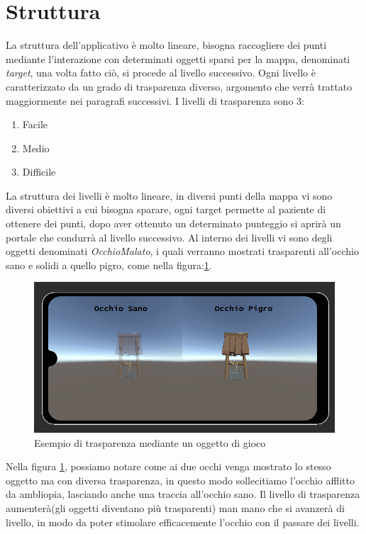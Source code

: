 \documentclass[
a4paper,
cleardoublepage=empty,
headings=twolinechapter,
numbers=autoenddot,
]{scrbook}
\begin{document}
	\section{Struttura}
	La struttura dell'applicativo è molto lineare, bisogna raccogliere dei punti mediante l'interazione con determinati oggetti sparsi per la mappa, denominati \textit{target}, una volta fatto ciò, si procede al livello successivo.
	Ogni livello è caratterizzato da un grado di trasparenza diverso, argomento che verrà trattato maggiormente nei paragrafi successivi.
	I livelli di trasparenza sono 3:
	\begin{enumerate}
		\item Facile
		\item Medio
		\item Difficile
	\end{enumerate}
	La struttura dei livelli è molto lineare, in diversi punti della mappa vi sono diversi obiettivi a cui bisogna sparare, ogni target permette al paziente di ottenere dei punti, dopo aver ottenuto un determinato punteggio si aprirà un portale che condurrà al livello successivo.
	Al interno dei livelli vi sono degli oggetti denominati \textit{OcchioMalato}, i quali verranno mostrati trasparenti all'occhio sano e solidi a quello pigro, come nella figura:\ref{fig:pozzo}. 
	\begin{figure}[H]
		\centering
		\includegraphics[width=0.8\linewidth]{image/Pr_trasparenza}
		\caption{Esempio di trasparenza mediante un oggetto di gioco}
		\label{fig:pozzo}
	\end{figure}
	Nella figura \ref{fig:pozzo}, possiamo notare come ai due occhi venga mostrato lo stesso oggetto ma con diversa trasparenza, in questo modo sollecitiamo l'occhio afflitto da ambliopia, lasciando anche una traccia all'occhio sano.
	Il livello di trasparenza aumenterà(gli oggetti diventano più trasparenti) man mano che si avanzerà di livello, in modo da poter stimolare efficacemente l'occhio con il passare dei livelli.
\end{document}
